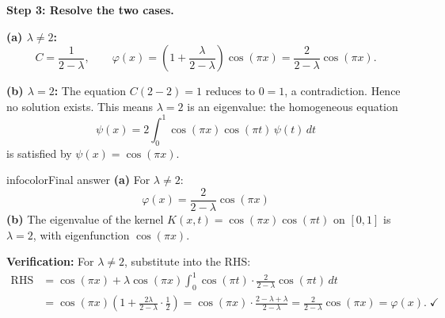 \documentclass[a4paper,11pt]{article} %
\newenvironment{summarybox}[1][]{\begin{custombox}[#1]{infocolor}{Final answer}}{\end{custombox}}
\begin{document}
\textbf{Step 3: Resolve the two cases.}

\textbf{(a) $\lambda \neq 2$:}
\[
    C = \frac{1}{2-\lambda}, \qquad
    \varphi(x) = \left(1 + \frac{\lambda}{2-\lambda}\right)\cos(\pi x) = \frac{2}{2-\lambda}\cos(\pi x).
\]

\textbf{(b) $\lambda = 2$:}
The equation $C(2-2) = 1$ reduces to $0 = 1$, a contradiction. Hence no solution exists. This means $\lambda = 2$ is an eigenvalue: the homogeneous equation
\[
    \psi(x) = 2\int_0^1\cos(\pi x)\cos(\pi t)\,\psi(t)\,dt
\]
is satisfied by $\psi(x) = \cos(\pi x)$.

\begin{summarybox}
\textbf{(a)} For $\lambda \neq 2$:
$$\varphi(x) = \frac{2}{2-\lambda}\cos(\pi x)$$
\textbf{(b)} The eigenvalue of the kernel $K(x,t) = \cos(\pi x)\cos(\pi t)$ on $[0,1]$ is $\lambda = 2$, with eigenfunction $\cos(\pi x)$.
\end{summarybox}

\textbf{Verification:} For $\lambda \neq 2$, substitute into the RHS:
\begin{align*}
    \text{RHS} &= \cos(\pi x) + \lambda\cos(\pi x)\int_0^1\cos(\pi t)\cdot\frac{2}{2-\lambda}\cos(\pi t)\,dt \\
    &= \cos(\pi x)\!\left(1 + \frac{2\lambda}{2-\lambda}\cdot\frac{1}{2}\right)
     = \cos(\pi x)\cdot\frac{2-\lambda+\lambda}{2-\lambda} = \frac{2}{2-\lambda}\cos(\pi x) = \varphi(x). \;\checkmark
\end{align*}
\end{document}
